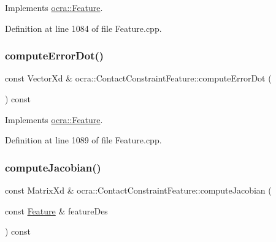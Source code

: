 Implements \hyperlink{classocra_1_1Feature_ac714181e1bb25f878349e299c4ba8c00}{ocra\+::\+Feature}.



Definition at line 1084 of file Feature.\+cpp.

\hypertarget{classocra_1_1ContactConstraintFeature_afbe828f952c7583b690e394efd05423f}{}\label{classocra_1_1ContactConstraintFeature_afbe828f952c7583b690e394efd05423f} 
\subsubsection{\texorpdfstring{compute\+Error\+Dot()}{computeErrorDot()}\hspace{0.1cm}{\footnotesize\ttfamily [2/2]}}
{\footnotesize\ttfamily const Vector\+Xd \& ocra\+::\+Contact\+Constraint\+Feature\+::compute\+Error\+Dot (\begin{DoxyParamCaption}{ }\end{DoxyParamCaption}) const\hspace{0.3cm}{\ttfamily [virtual]}}



Implements \hyperlink{classocra_1_1Feature_a01a4870418ba87d5b41d8f917c1255fc}{ocra\+::\+Feature}.



Definition at line 1089 of file Feature.\+cpp.

\hypertarget{classocra_1_1ContactConstraintFeature_a7b0fc26f03104eb02a7ba565b99a41d7}{}\label{classocra_1_1ContactConstraintFeature_a7b0fc26f03104eb02a7ba565b99a41d7} 
\subsubsection{\texorpdfstring{compute\+Jacobian()}{computeJacobian()}\hspace{0.1cm}{\footnotesize\ttfamily [1/2]}}
{\footnotesize\ttfamily const Matrix\+Xd \& ocra\+::\+Contact\+Constraint\+Feature\+::compute\+Jacobian (\begin{DoxyParamCaption}\item[{const \hyperlink{classocra_1_1Feature}{Feature} \&}]{feature\+Des }\end{DoxyParamCaption}) const\hspace{0.3cm}{\ttfamily [virtual]}}



